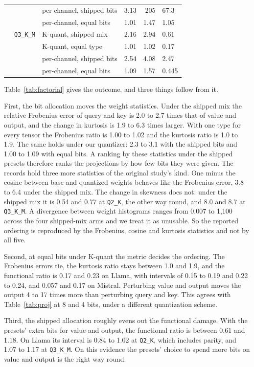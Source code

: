 \documentclass[journal]{IEEEtran}
\begin{document}
\begin{table}[t]
\begin{tabular}{lllrrl}
 & & per-channel, shipped bits & 3.13 & 205 & 67.3 \\
 & & per-channel, equal bits & 1.01 & 1.47 & 1.05 \\
 & \texttt{Q3\_K\_M} & K-quant, shipped mix & 2.16 & 2.94 & 0.61 \\
 & & K-quant, equal type & 1.01 & 1.02 & 0.17 \\
 & & per-channel, shipped bits & 2.54 & 4.08 & 2.47 \\
  & & per-channel, equal bits & 1.09 & 1.57 & 0.445 \\
\bottomrule
\end{tabular}
\end{table}

Table~\ref{tab:factorial} gives the outcome, and three things follow from it.

First, the bit allocation moves the weight statistics. Under the shipped mix the relative
Frobenius error of query and key is 2.0 to 2.7 times that of value and output, and the change in
kurtosis is 1.9 to 6.3 times larger. With one type for every tensor the Frobenius ratio is 1.00
to 1.02 and the kurtosis ratio is 1.0 to 1.9. The same holds under our quantizer: 2.3 to 3.1 with
the shipped bits and 1.00 to 1.09 with equal bits. A ranking by these statistics under the
shipped presets therefore ranks the projections by how few bits they were given. The records hold
three more statistics of the original study's kind. One minus the cosine between base and
quantized weights behaves like the Frobenius error, 3.8 to 6.4 under the shipped mix. The change
in skewness does not: under the shipped mix it is 0.54 and 0.77 at \texttt{Q2\_K}, the other way
round, and 8.0 and 8.7 at \texttt{Q3\_K\_M}. A divergence between weight histograms ranges from
0.007 to 1{,}100 across the four shipped-mix arms and we treat it as unusable. So the reported
ordering is reproduced by the Frobenius, cosine and kurtosis statistics and not by all five.

Second, at equal bits under K-quant the metric decides the ordering. The Frobenius errors tie,
the kurtosis ratio stays between 1.0 and 1.9, and the functional ratio is 0.17 and 0.23 on Llama, with intervals of 0.15 to 0.19 and
0.22 to 0.24, and 0.057 and 0.17 on Mistral. Perturbing
value and output moves the output 4 to 17 times more than perturbing query and key. This agrees
with Table~\ref{tab:proj} at 8 and 4 bits, under a different quantization scheme.

Third, the shipped allocation roughly evens out the functional damage. With the presets' extra
bits for value and output, the functional ratio is between 0.61 and 1.18. On Llama its interval
is 0.84 to 1.02 at \texttt{Q2\_K}, which includes parity, and 1.07 to 1.17 at \texttt{Q3\_K\_M}.
On this evidence the
presets' choice to spend more bits on value and output is the right way round.
\end{document}

